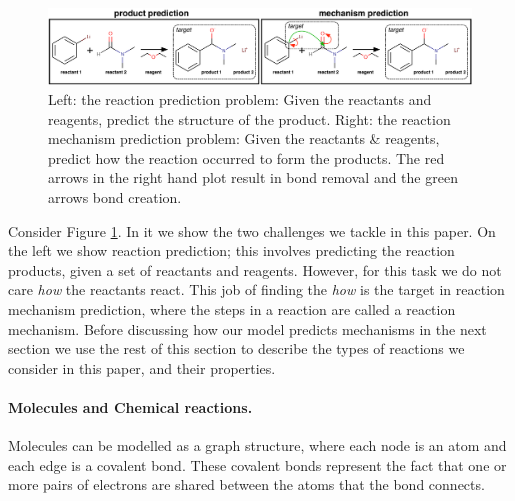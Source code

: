 

\begin{figure}[t!]
\centering
\includegraphics[width=\textwidth]{reaction_diagram}
\caption{Left: the reaction prediction problem: Given the reactants and reagents, predict the structure of the product. Right: the reaction mechanism prediction problem: Given the reactants \& reagents, predict how the reaction occurred to form the products. The red arrows in the right hand plot result in bond removal and the green arrows bond creation.}
\label{fig:task-overview}
\end{figure}


Consider Figure \ref{fig:task-overview}. In it we show the two challenges we tackle in this paper. 
On the left we show reaction prediction; this involves predicting the reaction products, given a set of reactants and reagents. However, for this task we do not care {\em how} the reactants react.
 This job of finding the {\em how} is the target in reaction mechanism prediction, where the steps in a reaction are called a reaction mechanism.
 Before discussing how our model predicts mechanisms in the next section we use the rest of this section to describe the types of reactions we consider in this paper, and their properties.


\paragraph{Molecules and Chemical reactions.}


Molecules can be modelled as a graph structure, where each node is an atom and each edge is a covalent bond.
These covalent bonds represent the fact that 
one or more pairs of electrons are shared between the atoms that the bond connects. 


